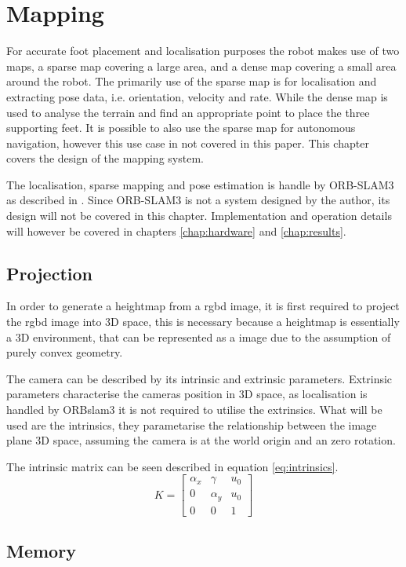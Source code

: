 \chapter{Mapping} \label{chap:mapping}
For accurate foot placement and localisation purposes the robot makes use of two maps, a sparse map covering a large area, and a dense map covering a small
area around the robot. The primarily use of the sparse map is for localisation and extracting pose data, i.e. orientation, velocity and rate. While the dense
map is used to analyse the terrain and find an appropriate point to place the three supporting feet.
It is possible to also use the sparse map for autonomous navigation, however this use case in not covered in this paper.
This chapter covers the design of the mapping system.

The localisation, sparse mapping and pose estimation is handle by ORB-SLAM3 as described in \cite{campos2021orb}. Since ORB-SLAM3 is not a system designed by the author, its
design will not be covered in this chapter. Implementation and operation details will however be covered in chapters \ref{chap:hardware} and \ref{chap:results}.

\section{Projection}
In order to generate a heightmap from a \ac{rgbd} image, it is first required to project the \ac{rgbd} image into 3D space, this is necessary because a heightmap is essentially a 3D environment,
that can be represented as a image due to the assumption of purely convex geometry. 

The camera can be described by its intrinsic and extrinsic parameters. Extrinsic parameters characterise the
cameras position in 3D space, as localisation is handled by ORB\ac{slam}3 it is not required to utilise the extrinsics. What will be used are the intrinsics, they parametarise 
the relationship between the image plane 3D space, assuming the camera is at the world origin and an zero rotation. \cite{hartley2003multiple}

The intrinsic matrix can be seen described in equation \ref{eq:intrinsics}.
\begin{equation} \label{eq:intrinsics}
    K =
    \begin{bmatrix}
        \alpha_x & \gamma   & u_0 \\
        0        & \alpha_y & u_0 \\
        0        & 0        & 1
    \end{bmatrix}
\end{equation}



\section{Memory}

